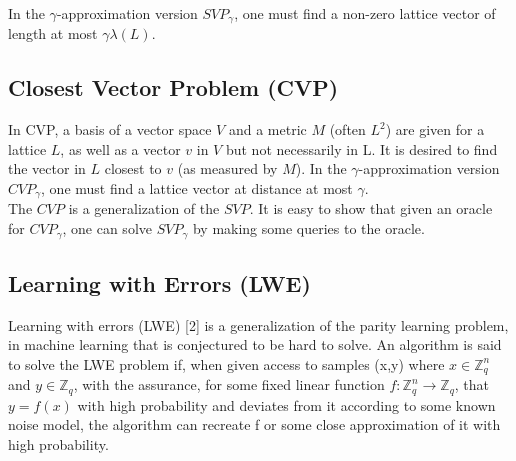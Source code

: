 \documentclass[conference]{IEEEtran}
\begin{document}
In the $\gamma$-approximation version $SVP_\gamma$, one must find a non-zero lattice vector of length at most $\gamma \lambda(L)$.
\subsection{Closest Vector Problem (CVP)}
In CVP, a basis of a vector space $V$ and a metric $M$ (often $L^2$) are given for a lattice $L$, as well as a vector $v$ in $V$ but not necessarily in L. It is desired to find the vector in $L$ closest to $v$ (as measured by $M$). In the $\gamma$-approximation version $CVP_\gamma$, one must find a lattice vector at distance at most $\gamma$.\\
The $CVP$ is a generalization of the $SVP$. It is easy to show that given an oracle for $CVP_\gamma$, one can solve $SVP_\gamma$ by making some queries to the oracle.
\subsection{Learning with Errors (LWE)}
Learning with errors (LWE) [2] is a generalization of the parity learning problem,  in machine learning that is conjectured to be hard to solve.
An algorithm is said to solve the LWE problem if, when given access to samples (x,y) where $x\in \mathbb{Z}_q^n$ and $y\in \mathbb{Z}_q$, with the assurance, for some fixed linear function $f:\mathbb{Z}_q^n \rightarrow \mathbb{Z}_q$, that $y=f(x)$ with high probability and deviates from it according to some known noise model, the algorithm can recreate f or some close approximation of it with high probability.
\end{document}
